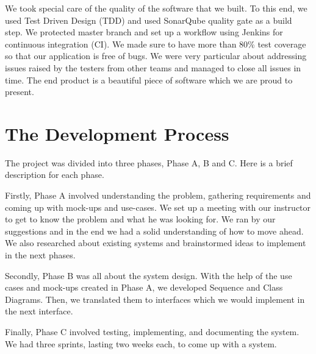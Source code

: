 \documentclass[12pt]{article}
\begin{document}
We took special care of the quality of the software that we built. To this end, we used Test Driven Design (TDD) and used SonarQube quality gate as a build step. We protected master branch and set up a workflow using Jenkins for continuous integration (CI). We made sure to have more than 80\% test coverage so that our application is free of bugs. 
We were very particular about addressing issues raised by the testers from other teams and managed to close all issues in time. The end product is a beautiful piece of software which we are proud to present.\par

\pagebreak
\section{The Development Process}
The project was divided into three phases, Phase A, B and C. Here is a brief description for each phase. 

\par Firstly, Phase A involved understanding the problem, gathering requirements and coming up with mock-ups and use-cases. We set up a meeting with our instructor to get to know the problem and what he was looking for. We ran by our suggestions and in the end we had a solid understanding of how to move ahead. We also researched about existing systems and brainstormed ideas to implement in the next phases. 

\par Secondly, Phase B was all about the system design. With the help of the use cases and mock-ups created in Phase A, we developed Sequence and Class Diagrams. Then, we translated them to interfaces which we would implement in the next interface. 

\par Finally, Phase C involved testing, implementing, and documenting the system. We had three sprints, lasting two weeks each, to come up with a system. 
\end{document}
